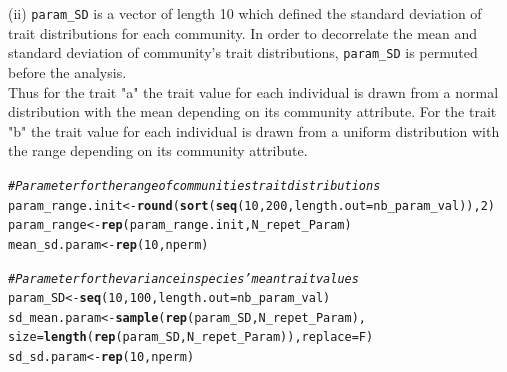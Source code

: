 \documentclass[12pt]{article}\usepackage[]{graphicx}\usepackage[]{color}
\makeatletter
\newcommand{\hlnum}[1]{\textcolor[rgb]{0.686,0.059,0.569}{#1}}%
\newcommand{\hlcom}[1]{\textcolor[rgb]{0.678,0.584,0.686}{\textit{#1}}}%
\newcommand{\hlstd}[1]{\textcolor[rgb]{0.345,0.345,0.345}{#1}}%
\newcommand{\hlkwb}[1]{\textcolor[rgb]{0.69,0.353,0.396}{#1}}%
\newcommand{\hlkwc}[1]{\textcolor[rgb]{0.333,0.667,0.333}{#1}}%
\newcommand{\hlkwd}[1]{\textcolor[rgb]{0.737,0.353,0.396}{\textbf{#1}}}%
\newenvironment{kframe}{%
 \def\at@end@of@kframe{}%
 \ifinner\ifhmode%
  \def\at@end@of@kframe{\end{minipage}}%
  \begin{minipage}{\columnwidth}%
 \fi\fi%
 \def\FrameCommand##1{\hskip\@totalleftmargin \hskip-\fboxsep
 \colorbox{shadecolor}{##1}\hskip-\fboxsep
     \hskip-\linewidth \hskip-\@totalleftmargin \hskip\columnwidth}%
 \MakeFramed {\advance\hsize-\width
   \@totalleftmargin\z@ \linewidth\hsize
   \@setminipage}}%
 {\par\unskip\endMakeFramed%
 \at@end@of@kframe}
\newenvironment{knitrout}{}{} %
\makeatother
\begin{document}
(ii) \texttt{param\_{}SD} is a vector of length 10 which defined the standard deviation of trait distributions for each community. In order to decorrelate the mean and standard deviation of community's trait distributions, \texttt{param\_{}SD} is permuted before the analysis. 
\\

 Thus for the trait "a" the trait value for each individual is drawn from a normal distribution with the mean depending on its community attribute. For the trait "b" the trait value for each individual is drawn from a uniform distribution with the range depending on its community attribute.
 
\begin{knitrout}\small
{}\color{fgcolor}\begin{kframe}
\begin{alltt}
\hlcom{# Parameter for the range of communities trait distributions}
\hlstd{param_range.init} \hlkwb{<-} \hlkwd{round}\hlstd{(}\hlkwd{sort}\hlstd{(}\hlkwd{seq}\hlstd{(}\hlnum{10}\hlstd{,} \hlnum{200}\hlstd{,} \hlkwc{length.out} \hlstd{= nb_param_val)),} \hlnum{2}\hlstd{)}
\hlstd{param_range} \hlkwb{<-} \hlkwd{rep}\hlstd{(param_range.init, N_repet_Param)}
\hlstd{mean_sd.param} \hlkwb{<-} \hlkwd{rep}\hlstd{(}\hlnum{10}\hlstd{, nperm)}

\hlcom{# Parameter for the variance in species' mean trait values}
\hlstd{param_SD} \hlkwb{<-} \hlkwd{seq}\hlstd{(}\hlnum{10}\hlstd{,} \hlnum{100}\hlstd{,}\hlkwc{length.out} \hlstd{= nb_param_val)}
\hlstd{sd_mean.param} \hlkwb{<-} \hlkwd{sample} \hlstd{(}\hlkwd{rep}\hlstd{(param_SD, N_repet_Param),}
       \hlkwc{size} \hlstd{=} \hlkwd{length}\hlstd{(}\hlkwd{rep}\hlstd{(param_SD, N_repet_Param)),} \hlkwc{replace} \hlstd{= F)}
\hlstd{sd_sd.param} \hlkwb{<-} \hlkwd{rep}\hlstd{(}\hlnum{10}\hlstd{, nperm)}
\end{alltt}
\end{kframe}
\end{knitrout}
\end{document}
